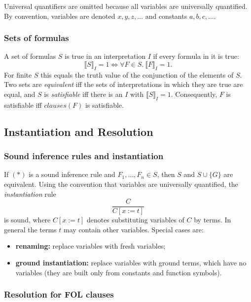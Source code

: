 Universal quantifiers are omitted because all variables are universally quantified. By convention, variables are denoted $x, y, z, \ldots$ and constants $a, b, c, \ldots$.
 
\subsubsection*{Sets of formulas}
 
A set of formulas $S$ is true in an interpretation $I$ if every formula in it is true:
\[
\llbracket S \rrbracket_I = 1 \iff \forall F \in S.\ \llbracket F \rrbracket_I = 1.
\]
For finite $S$ this equals the truth value of the conjunction of the elements of $S$. Two sets are \emph{equivalent} iff the sets of interpretations in which they are true are equal, and $S$ is \emph{satisfiable} iff there is an $I$ with $\llbracket S \rrbracket_I = 1$. Consequently, $F$ is satisfiable iff $\mathit{clauses}(F)$ is satisfiable.
 
\subsection{Instantiation and Resolution}
 
\subsubsection*{Sound inference rules and instantiation}
 
 
If $(*)$ is a sound inference rule and $F_1, \ldots, F_n \in S$, then $S$ and $S \cup \{G\}$ are equivalent. Using the convention that variables are universally quantified, the \emph{instantiation} rule
\[
\frac{C}{C[x := t]}
\]
is sound, where $C[x := t]$ denotes substituting variables of $C$ by terms. In general the terms $t$ may contain other variables. Special cases are:
\begin{itemize}
  \item \textbf{renaming:} replace variables with fresh variables;
  \item \textbf{ground instantiation:} replace variables with ground terms, which have no variables (they are built only from constants and function symbols).
\end{itemize}
 
\subsubsection*{Resolution for FOL clauses}
 

